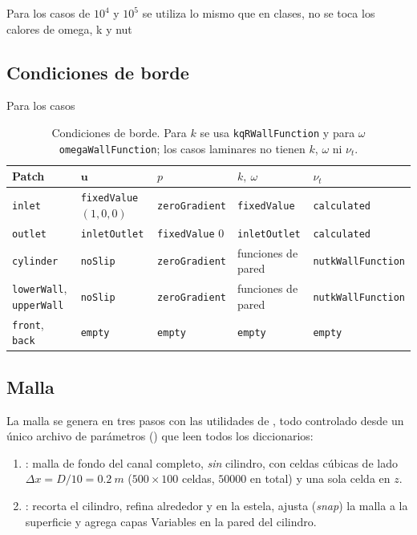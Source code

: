 Para los casos de $10^4$ y $10^5$ se utiliza lo mismo que en clases, no se toca los calores de omega, k y nut

\subsection{Condiciones de borde}
Para los casos 
\label{sec:bc}
\begin{table}[H]
\centering
\footnotesize
\setlength{\tabcolsep}{4pt}
\begin{tabular}{lllll}
\toprule
Patch & $\mathbf{u}$ & $p$ & $k,\ \omega$ & $\nu_t$ \\
\midrule
\texttt{inlet} & \texttt{fixedValue} $(1,0,0)$ & \texttt{zeroGradient} & \texttt{fixedValue} & \texttt{calculated} \\
\texttt{outlet} & \texttt{inletOutlet} & \texttt{fixedValue} 0 & \texttt{inletOutlet} & \texttt{calculated} \\
\texttt{cylinder} & \texttt{noSlip} & \texttt{zeroGradient} & funciones de pared & \texttt{nutkWallFunction} \\
\texttt{lowerWall}, \texttt{upperWall} & \texttt{noSlip} & \texttt{zeroGradient} & funciones de pared & \texttt{nutkWallFunction} \\
\texttt{front}, \texttt{back} & \texttt{empty} & \texttt{empty} & \texttt{empty} & \texttt{empty} \\
\bottomrule
\end{tabular}
\caption{Condiciones de borde. Para $k$ se usa \texttt{kqRWallFunction} y para $\omega$ \texttt{omegaWallFunction}; los casos laminares no tienen $k$, $\omega$ ni $\nu_t$.}
\label{tab:bc}
\end{table}


\subsection{Malla}
\label{sec:malla}
La malla se genera en tres pasos con las utilidades de \OF{}, todo controlado desde un único archivo de parámetros () que leen todos los diccionarios:

\begin{enumerate}[nosep]
  \item {}: malla de fondo del canal completo, \emph{sin} cilindro, con celdas cúbicas de lado $\Delta x = D/10 = \SI{0.2}{m}$ ($500\times100$ celdas, $\num{50000}$ en total) y una sola celda en $z$.
  \item {}: recorta el cilindro, refina alrededor y en la estela, ajusta (\emph{snap}) la malla a la superficie y agrega capas Variables en la pared del cilindro.

\end{enumerate}

